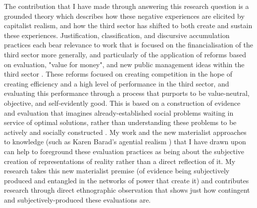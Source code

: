 The contribution that I have made through answering this research question is a grounded theory which describes how these negative experiences are elicited by capitalist realism, and how the third sector has shifted to both create and sustain these experiences. Justification, classification, and discursive accumulation practices each bear relevance to work that is focused on the financialisation of the third sector more generally, and particularly of the application of reforms based on evaluation, "value for money", and new public management ideas within the third sector \citep{mcmullin_challenging_2021}. These reforms focused on creating competition in the hope of creating efficiency and a high level of performance in the third sector, and evaluating this performance through a process that purports to be value-neutral, objective, and self-evidently good. This is based on a construction of evidence and evaluation that imagines already-established social problems waiting in service of optimal solutions, rather than understanding these problems to be actively and socially constructed \citep{greenhalgh_evidence_2009}. My work and the new materialist approaches to knowledge (such as Karen Barad's agential realism \citep[45]{barad_meeting_2007}) that I have drawn upon can help to foreground these evaluation practices as being about the subjective creation of representations of reality rather than a direct reflection of it. My research takes this new materialist premise (of evidence being subjectively produced and entangled in the networks of power that create it) and contributes research through direct ethnographic observation that shows just how contingent and subjectively-produced these evaluations are. 

